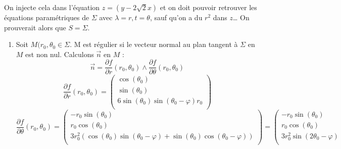 \begin{enumerate}
\begin{enumerate}
\[                \] On injecte cela dans l'équation $z=(y-2\sqrt{2}x)$ et on doit pouvoir retrouver les équations paramétriques de $\Sigma$ avec $\lambda = r, t = \theta$, sauf qu'on a du $r^{2}$ dans $z$\dots
                On prouverait alors que $S = \Sigma$.
        \end{enumerate}
        \begin{enumerate}
          \item
                Soit $M(r_0, \theta_0 \in \Sigma$. M est régulier si le vecteur normal au plan tangent à $\Sigma$ en $M$ est non nul.
                Calculons $\overrightarrow{n}$ en $M$ :
                \[
                  \overrightarrow{n} = \frac{\partial f}{\partial r}(r_0, \theta_0) \wedge \frac{\partial f}{\partial \theta}(r_0, \theta_0)
                \]
                \[
                  \frac{\partial f}{\partial r}(r_0, \theta_0) =
                  \left(
                  \begin{array}{c}
                      \cos{(\theta_0)}                               \\
                      \sin{(\theta_0)}                               \\
                      6\sin{(\theta_0)}\sin{(\theta_0 - \varphi)}r_0 \\
                    \end{array}
                  \right)
                \]
                \[
                  \frac{\partial f}{\partial \theta}(r_0, \theta_0) =
                  \left(
                  \begin{array}{c}
                      -r_0\sin{(\theta_0)}                                                                              \\
                      r_0\cos{(\theta_0)}                                                                               \\
                      3r_0^{2}(\cos{(\theta_0)}\sin{(\theta_0 - \varphi)} + \sin{(\theta_0)}\cos{(\theta_0 - \varphi)}) \\
                    \end{array}
                  \right) =
                  \left(
                  \begin{array}{c}
                      -r_0\sin{(\theta_0)}                \\
                      r_0\cos{(\theta_0)}                 \\
                      3r_0^{2}\sin{(2\theta_0 - \varphi)} \\

\end{array}\]
\end{enumerate}
\end{enumerate}
